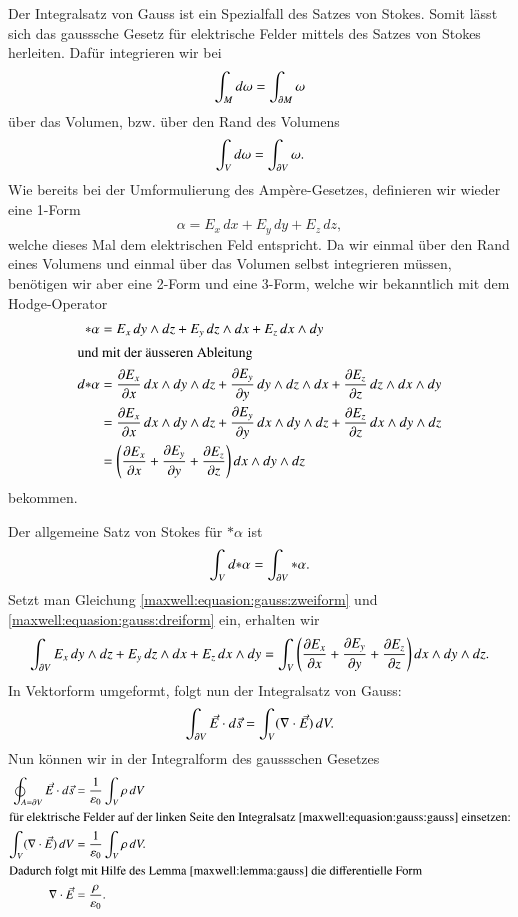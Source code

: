 Der Integralsatz von Gauss ist ein Spezialfall des Satzes von Stokes.
Somit lässt sich das gausssche Gesetz für elektrische Felder mittels des Satzes von Stokes herleiten.
Dafür integrieren wir bei
\[
\int_{M} d\omega
=
\int_{\d M} \omega
\]
über das Volumen, bzw. über den Rand des Volumens
\[
\int_{V} d\omega
=
\int_{\d V} \omega .
\]
Wie bereits bei der Umformulierung des Ampère-Gesetzes, definieren wir wieder eine 1-Form
\[
\alpha
=
E_x \, dx + E_y \, dy + E_z \, dz ,
\]
welche dieses Mal dem elektrischen Feld entspricht.
Da wir einmal über den Rand eines Volumens und einmal über das Volumen selbst integrieren müssen, benötigen wir aber eine 2-Form und eine 3-Form, welche wir bekanntlich mit dem Hodge-Operator
\begin{align}
	\ast\alpha
	&=
	E_x \, dy \wedge dz + E_y \, dz \wedge dx + E_z \, dx \wedge dy
	\label{maxwell:equasion:gauss:zweiform}
	\\
	\intertext{und mit der äusseren Ableitung}
	d{\ast}\alpha
	&=
	\frac{\d E_x}{\d x} \, dx \wedge dy \wedge dz +
	\frac{\d E_y}{\d y} \, dy \wedge dz \wedge dx +
	\frac{\d E_z}{\d z} \, dz \wedge dx \wedge dy
	\notag
	\\ 
	&=
	\frac{\d E_x}{\d x} \, dx \wedge dy \wedge dz +
	\frac{\d E_y}{\d y} \, dx \wedge dy \wedge dz +
	\frac{\d E_z}{\d z} \, dx \wedge dy \wedge dz
	\notag
	\\
	&=
	\left(
	\frac{\d E_x}{\d x} + \frac{\d E_y}{\d y} + \frac{\d E_z}{\d z}
	\right)
	dx \wedge dy \wedge dz 
	\label{maxwell:equasion:gauss:dreiform}
\end{align}
bekommen.

Der allgemeine Satz von Stokes für $\ast \alpha$ ist
\[
\int_{V} d {\ast} \alpha 
=
\int_{\d V} \ast \alpha .
\]
Setzt man Gleichung \eqref{maxwell:equasion:gauss:zweiform} und \eqref{maxwell:equasion:gauss:dreiform} ein, erhalten wir
\[
\int_{\d V}
E_x \, dy \wedge dz + E_y \, dz \wedge dx + E_z \, dx \wedge dy
=
\int_{V}
\left(
\frac{\d E_x}{\d x} + \frac{\d E_y}{\d y} + \frac{\d E_z}{\d z}
\right)
dx \wedge dy \wedge dz .
\]
In Vektorform umgeformt, folgt nun der Integralsatz von Gauss:
\begin{equation}
	\label{maxwell:equasion:gauss:gauss}
	\int_{\d V}
	\vec{E} \cdot d\vec{s}
	=
	\int_{V}
	(\nabla \cdot \vec{E}) \, dV .
\end{equation}
Nun können wir in der Integralform des gaussschen Gesetzes
\begin{align*}
	\oint_{A=\d V} \vec{E} \cdot d\vec{s}
	&=
	\frac{1}{\varepsilon_0}\int_{V} \rho \, dV
	\\
	\intertext{für elektrische Felder auf der linken Seite
den Integralsatz \eqref{maxwell:equasion:gauss:gauss} einsetzen:}
	\int_{V}
	(\nabla \cdot \vec{E}) \, dV
	&=
	\frac{1}{\varepsilon_0}\int_{V} \rho \, dV .
	\\
	\intertext{Dadurch folgt mit Hilfe des Lemma \ref{maxwell:lemma:gauss} die differentielle Form}
	\nabla \cdot \vec{E}
	&=
	\frac{\rho}{\varepsilon_0}.
\end{align*} 

